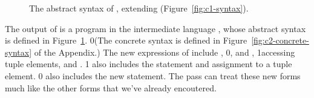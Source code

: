\documentclass[7x10]{TimesAPriori_MIT}%
\newcommand{\gray}[1]{{\color{gray} #1}}
\def\racketEd{0}
\def\pythonEd{1}
\def\edition{1}
\newcommand{\racket}[1]{{\if\edition\racketEd{#1}\fi}}
\newcommand{\python}[1]{{\if\edition\pythonEd #1\fi}}
\begin{document}
\begin{figure}[tp]
\fbox{
  \begin{minipage}{0.96\textwidth}
    \small
{\if\edition\racketEd    
\[
\begin{array}{lcl}
\Atm &::=& \gray{ \INT{\Int} \MID \VAR{\Var} \MID \BOOL{\itm{bool}} }\\
\itm{cmp} &::= & \gray{  \key{eq?} \MID \key{<} } \\
\Exp &::= & \gray{ \Atm \MID \READ{} } \\
   &\MID& \gray{ \NEG{\Atm} \MID \ADD{\Atm}{\Atm} }\\
   &\MID& \gray{ \UNIOP{\key{not}}{\Atm} \MID \BINOP{\itm{cmp}}{\Atm}{\Atm}  } \\
   &\MID& \LP\key{Allocate} \,\itm{int}\,\itm{type}\RP \\
   &\MID& \BINOP{\key{'vector-ref}}{\Atm}{\INT{\Int}}  \\
   &\MID& \LP\key{Prim}~\key{'vector-set!}\,\LP\Atm\,\INT{\Int}\,\Atm\RP\RP\\
   &\MID& \LP\key{GlobalValue} \,\Var\RP \MID \LP\key{Void}\RP\\
\Stmt &::=& \gray{ \ASSIGN{\VAR{\Var}}{\Exp} } 
       \MID \LP\key{Collect} \,\itm{int}\RP \\
\Tail &::= & \gray{ \RETURN{\Exp} \MID \SEQ{\Stmt}{\Tail} 
       \MID \GOTO{\itm{label}} } \\
      &\MID& \gray{ \IFSTMT{\BINOP{\itm{cmp}}{\Atm}{\Atm}}{\GOTO{\itm{label}}}{\GOTO{\itm{label}}}  }\\
\LangCVecM{} & ::= & \gray{ \CPROGRAM{\itm{info}}{\LP\LP\itm{label}\,\key{.}\,\Tail\RP\ldots\RP} }
\end{array}
\]
\fi}
{\if\edition\pythonEd
\[
\begin{array}{l}
  \gray{\CifASTPython} \\ \hline
  \CtupASTPython \\
\begin{array}{lcl}
\LangCVecM{} & ::= & \CPROGRAM{\itm{info}}{\LC\itm{label}\key{:}\,\Stmt^{*}, \ldots \RC}
\end{array}
\end{array}
\]
\fi}
\end{minipage}
}
\caption{The abstract syntax of \LangCVec{}, extending \LangCIf{}
   (Figure~\ref{fig:c1-syntax}).}
\label{fig:c2-syntax}
\end{figure}

The output of  is a program in the
intermediate language \LangCVec{}, whose abstract syntax is defined in
Figure~\ref{fig:c2-syntax}.
%
\racket{(The concrete syntax is defined in
  Figure~\ref{fig:c2-concrete-syntax} of the Appendix.)}
%
The new expressions of \LangCVec{} include ,
%
\racket{, and ,}
%
\python{accessing tuple elements,}
%
and .
%
\python{\LangCVec{} also includes the  statement and
assignment to a tuple element.}
%
\racket{\LangCVec{} also includes the new \code{collect} statement.}
%
The  pass can treat these new forms much like
the other forms that we've already encoutered.
\end{document}
